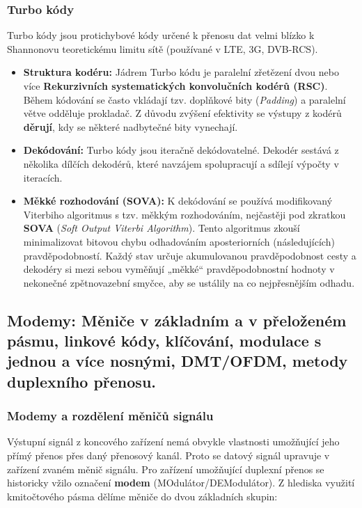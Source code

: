     \subsubsection{Turbo kódy}
        Turbo kódy jsou protichybové kódy určené k přenosu dat velmi blízko k Shannonovu teoretickému limitu sítě (používané v LTE, 3G, DVB-RCS).
        
        \begin{itemize}
            \item \textbf{Struktura kodéru:} Jádrem Turbo kódu je paralelní zřetězení dvou nebo více \textbf{Rekurzivních systematických konvolučních kodérů (RSC)}. Během kódování se často vkládají tzv. doplňkové bity (\textit{Padding}) a paralelní větve odděluje prokladač. Z důvodu zvýšení efektivity se výstupy z kodérů \textbf{děrují}, kdy se některé nadbytečné bity vynechají.
            \item \textbf{Dekódování:} Turbo kódy jsou iteračně dekódovatelné. Dekodér sestává z několika dílčích dekodérů, které navzájem spolupracují a sdílejí výpočty v iteracích.
            \item \textbf{Měkké rozhodování (SOVA):} K dekódování se používá modifikovaný Viterbiho algoritmus s tzv. měkkým rozhodováním, nejčastěji pod zkratkou \textbf{SOVA} (\textit{Soft Output Viterbi Algorithm}). Tento algoritmus zkouší minimalizovat bitovou chybu odhadováním aposteriorních (následujících) pravděpodobností. Každý stav určuje akumulovanou pravděpodobnost cesty a dekodéry si mezi sebou vyměňují „měkké“ pravděpodobnostní hodnoty v nekonečné zpětnovazební smyčce, aby se ustálily na co nejpřesnějším odhadu.
        \end{itemize}
\subsection{Modemy: Měniče v základním a v přeloženém pásmu, linkové kódy, klíčování, modulace s jednou a více nosnými, DMT/OFDM, metody duplexního přenosu. }
    \subsubsection{Modemy a rozdělení měničů signálu}
        Výstupní signál z koncového zařízení nemá obvykle vlastnosti umožňující jeho přímý přenos přes daný přenosový kanál. Proto se datový signál upravuje v zařízení zvaném měnič signálu. Pro zařízení umožňující duplexní přenos se historicky vžilo označení \textbf{modem} (MOdulátor/DEModulátor). Z hlediska využití kmitočtového pásma dělíme měniče do dvou základních skupin:
        

